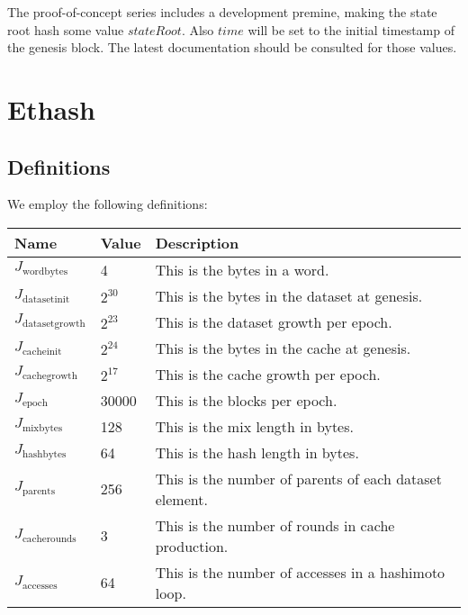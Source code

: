 \documentclass[9pt,oneside]{amsart}
\begin{document}
The proof-of-concept series includes a development premine, making the state root hash some value $stateRoot$. Also \hyperlink{H s}{$time$} will be set to the initial timestamp of the genesis block. The latest documentation should be consulted for those values.

\section{Ethash}\label{app:ethash}
\subsection{Definitions}
We employ the following definitions:

\begin{tabu}{X[,l]X[,r]X[,l]} 
\toprule
Name & Value & Description \hypertarget{Jwordbytes}{\\
\midrule 
$J_{\mathrm{wordbytes}}$ & 4  & This is the bytes in a word.}\hypertarget{Jdatasetinit}{\\
$J_{\mathrm{datasetinit}}$ & $2^{30}$ & This is the bytes in the dataset at genesis. }\hypertarget{Jdatasetgrowth}{\\
$J_{\mathrm{datasetgrowth}}$ & $2^{23}$ & This is the dataset growth per epoch. }\hypertarget{Jcacheinit}{\\
$J_{\mathrm{cacheinit}}$ & $2^{24}$ & This is the bytes in the cache at genesis.}\hypertarget{Jcachegrowth}{\\
$J_{\mathrm{cachegrowth}}$ & $2^{17}$ & This is the cache growth per epoch.}\hypertarget{Jepoch}{\\
$J_{\mathrm{epoch}}$ & 30000 & This is the blocks per epoch.}\hypertarget{Jmixbytes}{\\
$J_{\mathrm{mixbytes}}$ & 128 & This is the mix length in bytes.}\hypertarget{Jhashbytes}{\\
$J_{\mathrm{hashbytes}}$ & 64 & This is the hash length in bytes.}\hypertarget{Jparents}{\\
$J_{\mathrm{parents}}$ & 256 & This is the number of parents of each dataset element.}\hypertarget{Jcacherounds}{\\
$J_{\mathrm{cacherounds}}$ & 3 & This is the number of rounds in cache production.}\hypertarget{Jaccesses}{\\
$J_{\mathrm{accesses}}$ & 64 & This is the number of accesses in a hashimoto loop.}\\
\bottomrule
\end{tabu}
\end{document}
